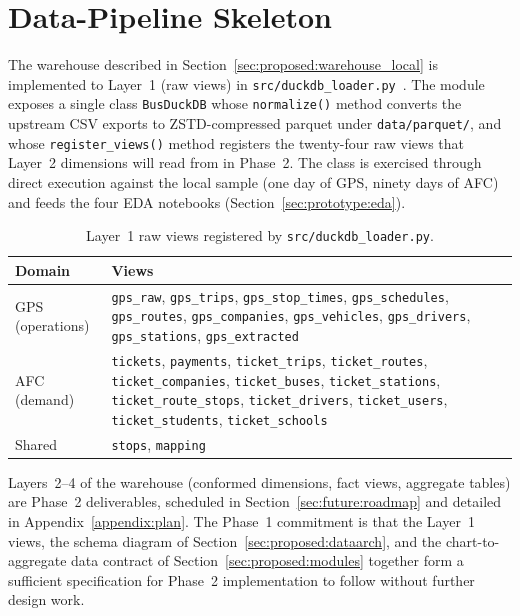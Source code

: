 \section{Data-Pipeline Skeleton}
\label{sec:prototype:warehouse}

The warehouse described in
Section~\ref{sec:proposed:warehouse_local} is implemented to
Layer~1 (raw views) in
\texttt{src/duckdb\_loader.py}~\cite{duckdb}. The module exposes
a single class \texttt{BusDuckDB} whose \texttt{normalize()}
method converts the upstream CSV exports to ZSTD-compressed
parquet under \texttt{data/parquet/}, and whose
\texttt{register\_views()} method registers the twenty-four raw
views that Layer~2 dimensions will read from in Phase~2. The
class is exercised through direct execution against the local
sample (one day of GPS, ninety days of AFC) and feeds the four
EDA notebooks (Section~\ref{sec:prototype:eda}).

\begin{table}[H]
\centering
\caption{Layer~1 raw views registered by
\texttt{src/duckdb\_loader.py}.}
\label{tab:prototype:rawviews}
\footnotesize
\renewcommand{\arraystretch}{1.15}
\begin{tabularx}{\linewidth}{p{3.4cm}X}
\hline
\textbf{Domain} & \textbf{Views} \\
\hline
GPS (operations) &
\texttt{gps\_raw}, \texttt{gps\_trips}, \texttt{gps\_stop\_times},
\texttt{gps\_schedules}, \texttt{gps\_routes},
\texttt{gps\_companies}, \texttt{gps\_vehicles},
\texttt{gps\_drivers}, \texttt{gps\_stations},
\texttt{gps\_extracted} \\
AFC (demand) &
\texttt{tickets}, \texttt{payments}, \texttt{ticket\_trips},
\texttt{ticket\_routes}, \texttt{ticket\_companies},
\texttt{ticket\_buses}, \texttt{ticket\_stations},
\texttt{ticket\_route\_stops}, \texttt{ticket\_drivers},
\texttt{ticket\_users}, \texttt{ticket\_students},
\texttt{ticket\_schools} \\
Shared & \texttt{stops}, \texttt{mapping} \\
\hline
\end{tabularx}
\end{table}

Layers~2--4 of the warehouse (conformed dimensions, fact views,
aggregate tables) are Phase~2 deliverables, scheduled in
Section~\ref{sec:future:roadmap} and detailed in
Appendix~\ref{appendix:plan}. The Phase~1 commitment is that
the Layer~1 views, the schema diagram of
Section~\ref{sec:proposed:dataarch}, and the chart-to-aggregate
data contract of Section~\ref{sec:proposed:modules} together
form a sufficient specification for Phase~2 implementation to
follow without further design work.

